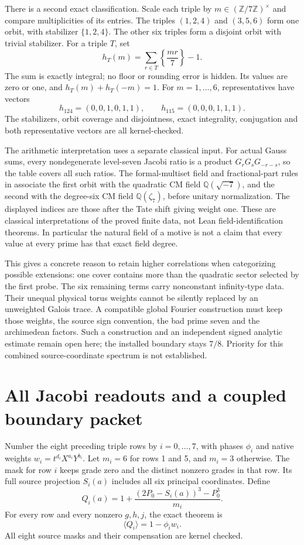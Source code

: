 \documentclass[11pt]{article}
\newcommand{\QQ}{\mathbb Q}
\newcommand{\ZZ}{\mathbb Z}
\begin{document}
There is a second exact classification. Scale each triple by
$m\in(\ZZ/7\ZZ)^\times$ and compare multiplicities of its entries.
The triples $(1,2,4)$ and $(3,5,6)$ form one orbit, with stabilizer
$\{1,2,4\}$. The other six triples form a disjoint orbit with trivial
stabilizer. For a triple $T$, set
\[
 h_T(m)=\sum_{r\in T}\left\{\frac{mr}{7}\right\}-1.
\]
The sum is exactly integral; no floor or rounding error is hidden.
Its values are zero or one, and $h_T(m)+h_T(-m)=1$.
For $m=1,\ldots,6$, representatives have vectors
\[
 h_{124}=(0,0,1,0,1,1),\qquad
 h_{115}=(0,0,0,1,1,1).
\]
The stabilizers, orbit coverage and disjointness, exact integrality,
conjugation and both representative vectors are all kernel-checked.

The arithmetic interpretation uses a separate classical input.
For actual Gauss sums, every nondegenerate level-seven Jacobi ratio
is a product $G_rG_sG_{-r-s}$, so the table covers all such ratios.
The formal-multiset field and fractional-part rules in
\cite[Sections 2.1--2.3]{Watkins} associate the first orbit with the
quadratic CM field $\QQ(\sqrt{-7})$, and the second with the degree-six
CM field $\QQ(\zeta_7)$, before unitary normalization. The displayed
indices are those after the Tate shift giving weight one.
These are classical interpretations of the proved finite data,
not Lean field-identification theorems. In particular the natural
field of a motive is not a claim that every value at every prime
has that exact field degree.

This gives a concrete reason to retain higher correlations when
categorizing possible extensions: one cover contains more than the
quadratic sector selected by the first probe. The six remaining
terms carry nonconstant infinity-type data. Their unequal physical
torus weights cannot be silently replaced by an unweighted Galois
trace. A compatible global Fourier construction must keep those
weights, the source sign convention, the bad prime seven and the
archimedean factors. Such a construction and an independent signed
analytic estimate remain open here; the installed boundary stays
$7/8$. Priority for this combined source-coordinate spectrum is
not established.

\section{All Jacobi readouts and a coupled boundary packet}
\label{sec:G2-seven-jacobi}

Number the eight preceding triple rows by $i=0,\ldots,7$, with
phases $\phi_i$ and native weights $w_i=t^{d_i}X^{a_i}Y^{b_i}$.
Let $m_i=6$ for rows 1 and 5, and $m_i=3$ otherwise.
The mask for row $i$ keeps grade zero and the distinct nonzero
grades in that row. Its full source projection $S_i(a)$ includes
all six principal coordinates. Define
\[
 Q_i(a)=1+\frac{(2P_0-S_i(a))^3-P_0^3}{m_i}.
\]
For every row and every nonzero $g,h,j$, the exact theorem is
\begin{equation}
 \langle Q_i\rangle=1-\phi_iw_i .
 \label{eq:all-jacobi-readouts}
\end{equation}
All eight source masks and their compensation are kernel checked.
\end{document}

